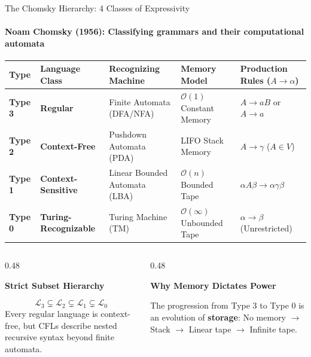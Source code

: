 \documentclass[aspectratio=169, 10pt]{beamer}
\newcommand{\cardtitle}[1]{{\noindent\footnotesize\bfseries\color{gimpanavy}#1}\par\vspace{0.03cm}}
\begin{document}
\begin{frame}{The Chomsky Hierarchy: 4 Classes of Expressivity}
  \framesubtitle{Noam Chomsky (1956): Classifying grammars and their computational automata}
  
  \vspace{-0.1cm}
  \begin{center}
    \scriptsize
    \setlength{\tabcolsep}{3pt}
    \renewcommand{\arraystretch}{1.15}
    \begin{tabular}{@{} l l l l l @{}}
      \toprule
      \textbf{Type} & \textbf{Language Class} & \textbf{Recognizing Machine} & \textbf{Memory Model} & \textbf{Production Rules ($A \to \alpha$)} \\
      \midrule
      \textbf{Type 3} & \textbf{Regular} & Finite Automata (DFA/NFA) & $\mathcal{O}(1)$ Constant Memory & $A \to aB$ or $A \to a$ \\
      \textbf{Type 2} & \textbf{Context-Free} & Pushdown Automata (PDA) & LIFO Stack Memory & $A \to \gamma$ ($A \in V$) \\
      \textbf{Type 1} & \textbf{Context-Sensitive} & Linear Bounded Automata (LBA) & $\mathcal{O}(n)$ Bounded Tape & $\alpha A \beta \to \alpha \gamma \beta$ \\
      \textbf{Type 0} & \textbf{Turing-Recognizable} & Turing Machine (TM) & $\mathcal{O}(\infty)$ Unbounded Tape & $\alpha \to \beta$ (Unrestricted) \\
      \bottomrule
    \end{tabular}
  \end{center}
  
  \vspace{-0.1cm}
  \begin{columns}[T]
    \begin{column}{0.48\textwidth}
      \begin{tcolorbox}[conceptcard]
        \cardtitle{Strict Subset Hierarchy}
        {\scriptsize
        \[ \mathcal{L}_3 \subsetneq \mathcal{L}_2 \subsetneq \mathcal{L}_1 \subsetneq \mathcal{L}_0 \]
        Every regular language is context-free, but CFLs describe nested recursive syntax beyond finite automata.
        }
      \end{tcolorbox}
    \end{column}
    
    \begin{column}{0.48\textwidth}
      \begin{tcolorbox}[spotlightcard]
        \cardtitle{Why Memory Dictates Power}
        {\scriptsize
        The progression from Type 3 to Type 0 is an evolution of \textbf{storage}:
        No memory $\longrightarrow$ Stack $\longrightarrow$ Linear tape $\longrightarrow$ Infinite tape.
        }
      \end{tcolorbox}
    \end{column}
  \end{columns}
\end{frame}
\end{document}
